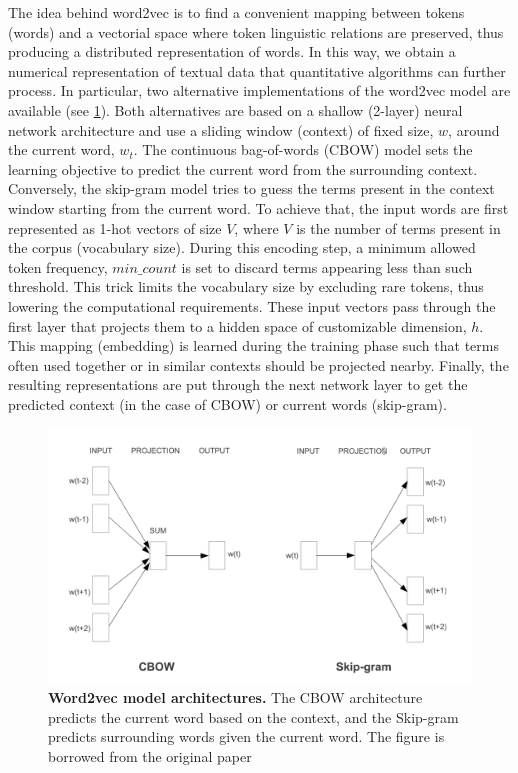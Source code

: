 The idea behind word2vec is to find a convenient mapping between tokens (words) and a vectorial space where token linguistic relations are preserved, thus producing a distributed representation of words.
In this way, we obtain a numerical representation of textual data that quantitative algorithms can further process.
In particular, two alternative implementations of the word2vec model are available (see \cref{fig:word2vec}).
Both alternatives are based on a shallow (2-layer) neural network architecture and use a sliding window (context) of fixed size, $w$, around the current word, $w_t$.
The continuous bag-of-words (CBOW) model sets the learning objective to predict the current word from the surrounding context.
Conversely, the \mbox{skip-gram} model tries to guess the terms present in the context window starting from the current word.
To achieve that, the input words are first represented as 1-hot vectors of size $V$, where $V$ is the number of terms present in the corpus (vocabulary size). 
During this encoding step, a minimum allowed token frequency, $min\_count$ is set to discard terms appearing less than such threshold. This trick limits the vocabulary size by excluding rare tokens, thus lowering the computational requirements.
These input vectors pass through the first layer that projects them to a hidden space of customizable dimension, $h$. This mapping (embedding) is learned during the training phase such that terms often used together or in similar contexts should be projected nearby.
Finally, the resulting representations are put through the next network layer to get the predicted context (in the case of CBOW) or current words (skip-gram).
\begin{figure}
    \centering
    \includegraphics[width=\textwidth]{figures/410_method/word2vec.png}
    \caption{\textbf{Word2vec model architectures.} The CBOW architecture predicts the current word based on the
context, and the Skip-gram predicts surrounding words given the current word. The figure is borrowed from the original paper \protect \cite{mikolov2013word2vec}
}
    \label{fig:word2vec}
\end{figure}

